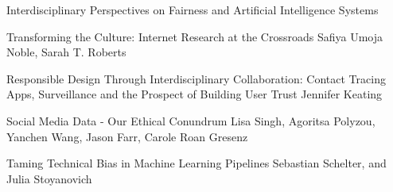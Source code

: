 \documentclass[11pt]{article}
\begin{document}
\begin{bulletin}
\begin{articlesection}{Interdisciplinary Perspectives on Fairness and Artificial Intelligence Systems}
%
%

\makeatletter
\renewcommand{\AB@affillist}{}
\renewcommand{\AB@authlist}{}
\setcounter{authors}{0}
\makeatother

\begin{article}
{Transforming the Culture: Internet Research at the Crossroads}
{Safiya Umoja Noble, Sarah T. Roberts}
\graphicspath{{Submissions_FouldsPan/NobleRoberts_final/}}

\end{article}

\makeatletter
\renewcommand{\AB@affillist}{}
\renewcommand{\AB@authlist}{}
\setcounter{authors}{0}
\makeatother

\begin{article}
{Responsible Design Through Interdisciplinary Collaboration: Contact Tracing Apps, Surveillance and the Prospect of Building User Trust}
{Jennifer Keating}
\graphicspath{{Submissions_FouldsPan/Keating_final/}}

\end{article}

\makeatletter
\renewcommand{\AB@affillist}{}
\renewcommand{\AB@authlist}{}
\setcounter{authors}{0}
\makeatother

\begin{article}
{Social Media Data - Our Ethical Conundrum}
{Lisa Singh, Agoritsa Polyzou, Yanchen Wang, Jason Farr, Carole Roan Gresenz}
\graphicspath{{Submissions_FouldsPan/Singh_final/figs}}

\end{article}

\makeatletter
\renewcommand{\AB@affillist}{}
\renewcommand{\AB@authlist}{}
\setcounter{authors}{0}
\makeatother

\begin{article}
{Taming Technical Bias in Machine Learning Pipelines}
{Sebastian Schelter, and Julia Stoyanovich}
\graphicspath{{Submissions_FouldsPan/ISchelterStoyanovich_final/figs/}}

\end{article}


\end{articlesection}
\end{bulletin}
\end{document}

